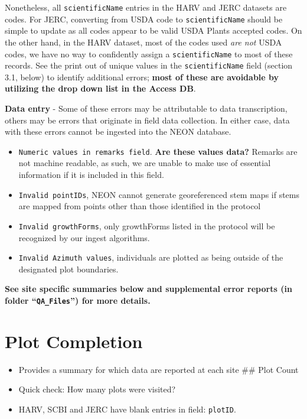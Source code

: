 \documentclass[]{article}
\begin{document}
Nonetheless, all \texttt{scientificName} entries in the HARV and JERC
datasets are codes. For JERC, converting from USDA code to
\texttt{scientificName} should be simple to update as all codes appear
to be valid USDA Plants accepted codes. On the other hand, in the HARV
dataset, most of the codes used \emph{are not} USDA codes, we have no
way to confidently assign a \texttt{scientificName} to most of these
records. See the print out of unique values in the
\texttt{scientificName} field (section 3.1, below) to identify
additional errors; \textbf{most of these are avoidable by utilizing the
drop down list in the Access DB}.

\textbf{Data entry} - Some of these errors may be attributable to data
transcription, others may be errors that originate in field data
collection. In either case, data with these errors cannot be ingested
into the NEON database.

\begin{itemize}
\itemsep1pt\parskip0pt
\item
  \texttt{Numeric values in remarks field}. \textbf{Are these values
  data?} Remarks are not machine readable, as such, we are unable to
  make use of essential information if it is included in this field.
\item
  \texttt{Invalid pointIDs}, NEON cannot generate georeferenced stem
  maps if stems are mapped from points other than those identified in
  the protocol
\item
  \texttt{Invalid growthForms}, only growthForms listed in the protocol
  will be recognized by our ingest algorithms.\\
\item
  \texttt{Invalid Azimuth values}, individuals are plotted as being
  outside of the designated plot boundaries.
\end{itemize}

\textbf{See site specific summaries below and supplemental error reports
(in folder ``\texttt{QA\_Files}'') for more details.}

\section{Plot Completion}\label{plot-completion}

\begin{itemize}
\itemsep1pt\parskip0pt
\item
  Provides a summary for which data are reported at each site \#\# Plot
  Count
\item
  Quick check: How many plots were visited?
\item
  HARV, SCBI and JERC have blank entries in field: \texttt{plotID}.
\end{itemize}
\end{document}
